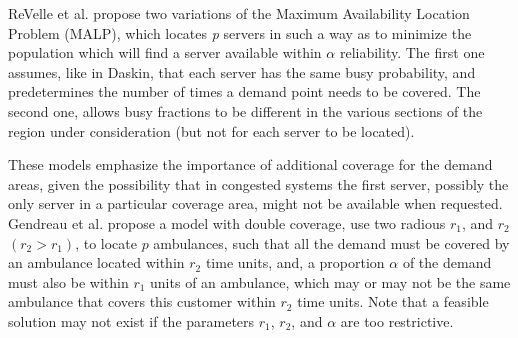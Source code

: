 ReVelle et al. \cite{revelle1989maximum}
propose two variations of the Maximum Availability Location Problem (MALP),
which locates \textit{p} servers
in such a way
as to minimize the population
which will find a server available within $\alpha$ reliability.
The first one assumes,
like in Daskin,
that each server has the same busy probability,
and predetermines the number of times a demand point needs to be covered.
The second one,
allows busy fractions
to be different in the various sections of the region under consideration
(but not for each server to be located).

These models
emphasize the importance of additional coverage
for the demand areas,
given the possibility that
in congested systems
the first server,
possibly
the only server in a particular coverage area,
might not be available when requested.
Gendreau et al. \cite{gendreau1997solving}
propose a model with double coverage,
use two radious $r_1$, and $r_2$ $(r_2 > r_1)$,
to locate $p$ ambulances,
such that
all the demand must be covered by an ambulance
located within $r_2$ time units,
and,
a proportion $\alpha$ of the demand
must also be within $r_1$ units of an ambulance,
which may or may not be the same ambulance that
covers this customer within $r_2$ time units.
Note that a feasible solution may not exist
if the parameters $r_1$, $r_2$, and $\alpha$ are too restrictive.
